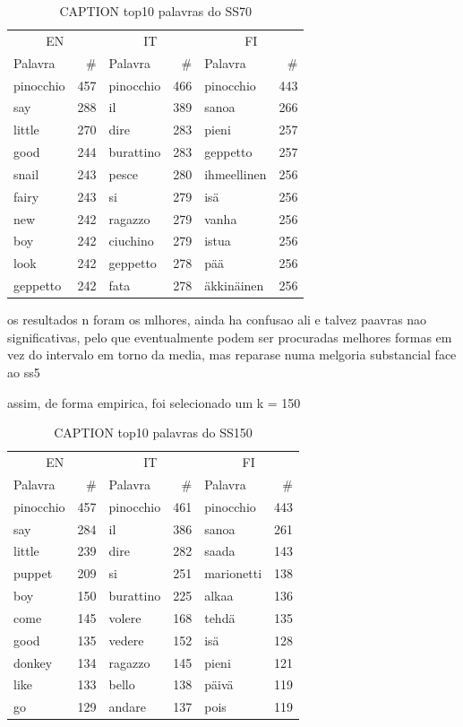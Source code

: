 \documentclass[mirror, portugues]{revdetua}
\begin{document}
\begin{table}[H]
\centering
\caption{CAPTION top10 palavras do SS70}
\label{table:top10_ss70}
\begin{tabular}{lr|lr|lr}
\toprule
\multicolumn{2}{c}{EN} & \multicolumn{2}{c}{IT} & \multicolumn{2}{c}{FI} \\
Palavra & \# & Palavra & \# & Palavra & \# \\
\midrule
pinocchio & 457 & pinocchio & 466 & pinocchio & 443 \\
say & 288 & il & 389 & sanoa & 266 \\
little & 270 & dire & 283 & pieni & 257 \\
good & 244 & burattino & 283 & geppetto & 257 \\
snail & 243 & pesce & 280 & ihmeellinen & 256 \\
fairy & 243 & si & 279 & isä & 256 \\
new & 242 & ragazzo & 279 & vanha & 256 \\
boy & 242 & ciuchino & 279 & istua & 256 \\
look & 242 & geppetto & 278 & pää & 256 \\
geppetto & 242 & fata & 278 & äkkinäinen & 256 \\
\bottomrule
\end{tabular}
\end{table}

os resultados n foram os mlhores, ainda ha confusao ali e talvez paavras nao significativas, pelo que eventualmente podem ser procuradas melhores formas em vez do intervalo em torno da media, mas reparase numa melgoria substancial face ao ss5

assim, de forma empirica, foi selecionado um k = 150

\begin{table}[H]
\centering
\caption{CAPTION top10 palavras do SS150}
\label{table:top10_ss150}
\begin{tabular}{lr|lr|lr}
\toprule
\multicolumn{2}{c}{EN} & \multicolumn{2}{c}{IT} & \multicolumn{2}{c}{FI} \\
Palavra & \# & Palavra & \# & Palavra & \# \\
\midrule
pinocchio & 457 & pinocchio & 461 & pinocchio & 443 \\
say & 284 & il & 386 & sanoa & 261 \\
little & 239 & dire & 282 & saada & 143 \\
puppet & 209 & si & 251 & marionetti & 138 \\
boy & 150 & burattino & 225 & alkaa & 136 \\
come & 145 & volere & 168 & tehdä & 135 \\
good & 135 & vedere & 152 & isä & 128 \\
donkey & 134 & ragazzo & 145 & pieni & 121 \\
like & 133 & bello & 138 & päivä & 119 \\
go & 129 & andare & 137 & pois & 119 \\
\bottomrule
\end{tabular}
\end{table}
\end{document}
